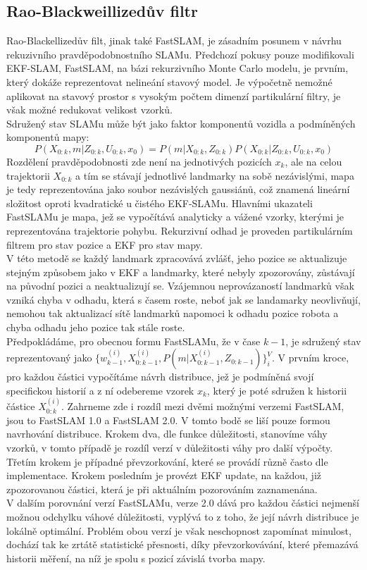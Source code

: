 \documentclass[11pt]{article}
\begin{document}
\subsection{Rao-Blackweillizedův filtr}
Rao-Blackellizedův filt, jinak také FastSLAM, je zásadním posunem v návrhu rekuzivního pravděpodobnostního SLAMu. Předchozí pokusy pouze modifikovali EKF-SLAM, FastSLAM, na bázi rekurzivního Monte Carlo modelu, je prvním, který dokáže reprezentovat nelineání stavový model. Je výpočetně nemožné aplikovat na stavový prostor s vysokým počtem dimenzí partikulární filtry, je však možné redukovat velikost vzorků. \\
Sdružený stav SLAMu může být jako faktor komponentů vozidla a podmíněných komponentů mapy:
$$P(X_{0:k},m|Z_{0:k},U_{0:k},x_0)=P(m|X_{0:k},Z_{0:k})P(X_{0:k}|Z_{0:k},U_{0:k},x_0) $$ 
Rozdělení pravděpodobnosti zde není na jednotivých pozicích $x_k$, ale na celou trajektorii $X_{0:k}$ a tím se stávají jednotlivé landmarky na sobě nezávislými, mapa je tedy reprezentována jako soubor nezávislých gaussiánů, což znamená lineární složitost oproti kvadratické u čistého EKF-SLAMu. Hlavními ukazateli FastSLAMu je mapa, jež se vypočítává analyticky a vážené vzorky, kterými je reprezentována trajektorie pohybu. Rekurzivní odhad je proveden partikulárním filtrem pro stav pozice a EKF pro stav mapy. \\
\indent V této metodě se každý landmark zpracovává zvlášť, jeho pozice se aktualizuje stejným způsobem jako v EKF a landmarky, které nebyly zpozorovány, zůstávají na původní pozici a neaktualizují se. Vzájemnou neprovázaností landmarků však vzniká chyba v odhadu, která s časem roste, neboť jak se landamarky neovlivňují, nemohou tak aktualizací sítě landmarků napomoci k odhadu pozice robota a chyba odhadu jeho pozice tak stále roste.  \\
\indent Předpokládáme, pro obecnou formu FastSLAMu, že v čase $k-1$, je sdružený stav reprezentovaný jako $\{w^{(i)}_{k-1},X^{(i)}_{0:k-1},P(m|X^{(i)}_{0:k-1},Z_{0:k-1})\}^V_i$. V prvním kroce, pro každou částici vypočítáme návrh distribuce, jež je podmíněná svojí specifickou historií a z ní odebereme vzorek $x_k$, který je poté sdružen k historii částice $X^{(i)}_{0:k}$. Zahrneme zde i rozdíl mezi dvěmi možnými verzemi FastSLAM, jsou to FastSLAM 1.0 a FastSLAM 2.0. V tomto bodě se liší pouze formou navrhování distribuce. Krokem dva, dle funkce důležitosti, stanovíme váhy vzorků, v tomto případě je rozdíl verzí v důležitosti váhy pro další výpočty. Třetím krokem je případné převzorkování, které se provádí různě často dle implementace. Krokem posledním je provézt EKF update, na každou, již zpozorovanou částici, která je při aktuálním pozorováním zaznamenána. \\
\indent V dalším porovnání verzí FastSLAMu, verze 2.0 dává pro každou částici nejmenší možnou odchylku váhové důležitosti, vyplývá to z toho, že její návrh distribuce je lokálně optimální. Problém obou verzí je však neschopnost zapomínat minulost, dochází tak ke zrtátě statistické přesnosti, díky převzorkovávání, které přemazává historii měření, na níž je spolu s pozicí závislá tvorba mapy.   
\newpage
\end{document}
